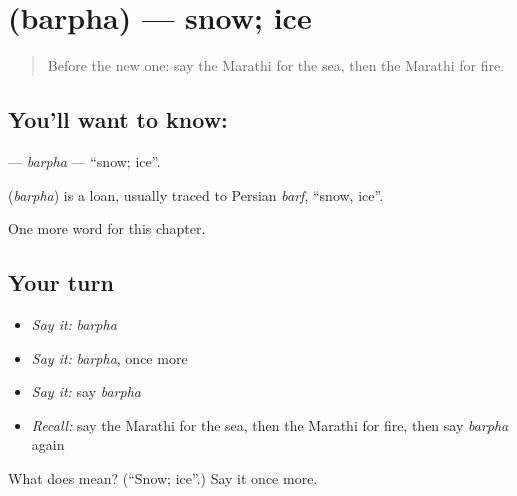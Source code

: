 \section[\texorpdfstring{\mr{बर्फ} (barpha)}{बर्फ (barpha)}]{ (barpha) — snow; ice}

\label{lesson:MR-C98-barpha}



\begin{quote}
Before the new one: say the Marathi for the sea, then the Marathi for fire.
\end{quote}

\subsection*{You'll want to know: }
\textbf{} — \emph{barpha} — \textquotedblleft{}snow; ice\textquotedblright{}.

\begin{cousinweb}
\textbf{} (\emph{barpha}) is a loan, usually traced to Persian \emph{barf}, \textquotedblleft{}snow, ice\textquotedblright{}.
\end{cousinweb}

\begin{grammarlens}[title={What you've built}]
One more word for this chapter.
\end{grammarlens}

\subsection*{Your turn}
\begin{itemize}
\raggedright
  \item \emph{Say it:} \emph{barpha}
  \item \emph{Say it:} \emph{barpha}, once more
  \item \emph{Say it:} say \emph{barpha}
  \item \emph{Recall:} say the Marathi for the sea, then the Marathi for fire, then say \emph{barpha} again
\end{itemize}

\begin{tcolorbox}[breakable,colback=teal!4,colframe=teal!35!black,title={Before you move on}]
What does  mean? (\textquotedblleft{}Snow; ice\textquotedblright{}.) Say it once more.
\end{tcolorbox}
